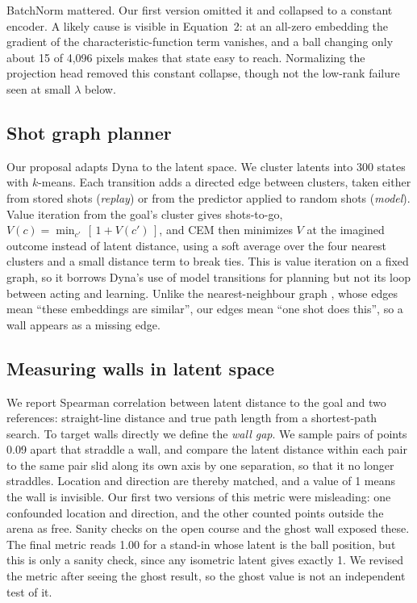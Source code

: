 \documentclass[10pt,twocolumn]{article}
\begin{document}
BatchNorm mattered. Our first version omitted it and collapsed to a constant encoder. A likely cause is visible in Equation~2: at an all-zero embedding the gradient of the characteristic-function term vanishes, and a ball changing only about 15 of 4,096 pixels makes that state easy to reach. Normalizing the projection head removed this constant collapse, though not the low-rank failure seen at small $\lambda$ below.

\subsection{Shot graph planner}
Our proposal adapts Dyna to the latent space. We cluster latents into 300 states with $k$-means. Each transition adds a directed edge between clusters, taken either from stored shots (\emph{replay}) or from the predictor applied to random shots (\emph{model}). Value iteration from the goal's cluster gives shots-to-go, $V(c)=\min_{c'}\,[\,1+V(c')\,]$, and CEM then minimizes $V$ at the imagined outcome instead of latent distance, using a soft average over the four nearest clusters and a small distance term to break ties. This is value iteration on a fixed graph, so it borrows Dyna's use of model transitions for planning but not its loop between acting and learning. Unlike the nearest-neighbour graph \cite{you2026ngc}, whose edges mean ``these embeddings are similar'', our edges mean ``one shot does this'', so a wall appears as a missing edge.

\subsection{Measuring walls in latent space}
\label{sec:gap}
We report Spearman correlation between latent distance to the goal and two references: straight-line distance and true path length from a shortest-path search. To target walls directly we define the \emph{wall gap}. We sample pairs of points 0.09 apart that straddle a wall, and compare the latent distance within each pair to the same pair slid along its own axis by one separation, so that it no longer straddles. Location and direction are thereby matched, and a value of 1 means the wall is invisible. Our first two versions of this metric were misleading: one confounded location and direction, and the other counted points outside the arena as free. Sanity checks on the open course and the ghost wall exposed these. The final metric reads 1.00 for a stand-in whose latent is the ball position, but this is only a sanity check, since any isometric latent gives exactly 1. We revised the metric after seeing the ghost result, so the ghost value is not an independent test of it.
\end{document}
